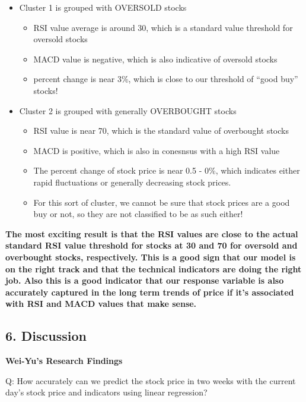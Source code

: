 \documentclass[
]{article}
\begin{document}
\begin{itemize}
\item
  Cluster 1 is grouped with OVERSOLD stocks

  \begin{itemize}
  \item
    RSI value average is around 30, which is a standard value threshold
    for oversold stocks
  \item
    MACD value is negative, which is also indicative of oversold stocks
  \item
    percent change is near 3\%, which is close to our threshold of
    ``good buy'' stocks!
  \end{itemize}
\item
  Cluster 2 is grouped with generally OVERBOUGHT stocks

  \begin{itemize}
  \item
    RSI value is near 70, which is the standard value of overbought
    stocks
  \item
    MACD is positive, which is also in conesnsus with a high RSI value
  \item
    The percent change of stock price is near 0.5 - 0\%, which indicates
    either rapid fluctuations or generally decreasing stock prices.
  \item
    For this sort of cluster, we cannot be sure that stock prices are a
    good buy or not, so they are not classified to be as such either!
  \end{itemize}
\end{itemize}

\textbf{The most exciting result is that the RSI values are close to the
actual standard RSI value threshold for stocks at 30 and 70 for oversold
and overbought stocks, respectively. This is a good sign that our model
is on the right track and that the technical indicators are doing the
right job. Also this is a good indicator that our response variable is
also accurately captured in the long term trends of price if it's
associated with RSI and MACD values that make sense.}

\hypertarget{discussion}{%
\subsection{6. Discussion}\label{discussion}}

\textbf{Wei-Yu's Research Findings}

Q: How accurately can we predict the stock price in two weeks with the
current day's stock price and indicators using linear regression?
\end{document}

